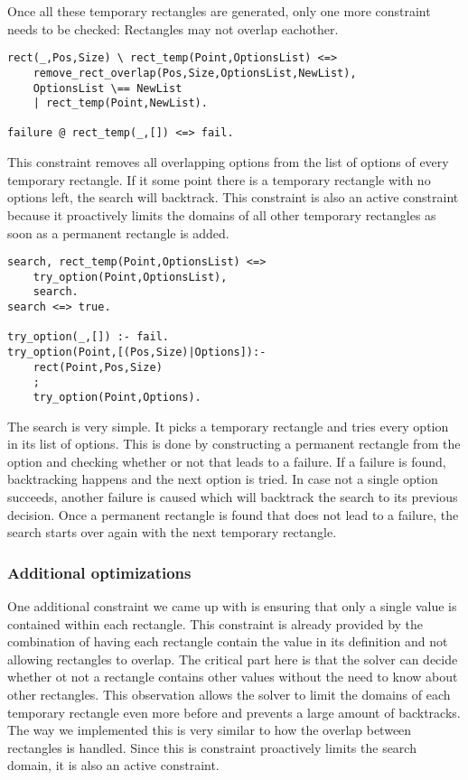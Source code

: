 Once all these temporary rectangles are generated, only one more constraint needs to be checked: Rectangles may not overlap eachother.

\begin{lstlisting}
rect(_,Pos,Size) \ rect_temp(Point,OptionsList) <=>
	remove_rect_overlap(Pos,Size,OptionsList,NewList),
	OptionsList \== NewList
	| rect_temp(Point,NewList).
	
failure @ rect_temp(_,[]) <=> fail.

\end{lstlisting}


This constraint removes all overlapping options from the list of options of every temporary rectangle. If it some point there is a temporary rectangle with no options left, the search will backtrack. This constraint is also an active constraint because it proactively limits the domains of all other temporary rectangles as soon as a permanent rectangle is added.
\begin{lstlisting}
search, rect_temp(Point,OptionsList) <=>
	try_option(Point,OptionsList),
	search.
search <=> true.

try_option(_,[]) :- fail.
try_option(Point,[(Pos,Size)|Options]):-
    rect(Point,Pos,Size)
    ;
    try_option(Point,Options).
\end{lstlisting}

The search is very simple. It picks a temporary rectangle and tries every option in its list of options. This is done by constructing a permanent rectangle from the option and checking whether or not that leads to a failure. If a failure is found, backtracking happens and the next option is tried. In case not a single option succeeds, another failure is caused which will backtrack the search to its previous decision. Once a permanent rectangle is found that does not lead to a failure, the search starts over again with the next temporary rectangle.


\subsubsection{Additional optimizations}
\label{sec:CHR_opti}
One additional constraint we came up with is ensuring that only a single value is contained within each rectangle. This constraint is already provided by the combination of having each rectangle contain the value in its definition and not allowing rectangles to overlap. The critical part here is that the solver can decide whether ot not a rectangle contains other values without the need to know about other rectangles. This observation allows the solver to limit the domains of each temporary rectangle even more before and prevents a large amount of backtracks. The way we implemented this is very similar to how the overlap between rectangles is handled. Since this is constraint proactively limits the search domain, it is also an active constraint.


